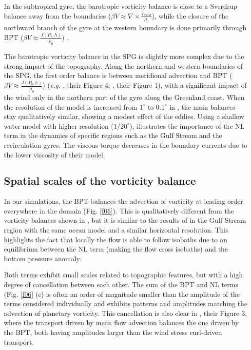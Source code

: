 \documentclass[os, manuscript]{copernicus}
\begin{document}
In the subtropical gyre, the barotropic vorticity balance is close to a Sverdrup balance away from the boundaries ($\beta V \approx \nabla \times \frac{\tau _{wind}}{\rho_{0}}$), while the closure of the northward branch of the gyre at the western boundary is done primarily through BPT ($\beta V \approx \frac{J(P_b,h)}{\rho _0}$)  \citep{schoonover2016}.

The barotropic vorticity balance in the SPG is slightly more complex due to the strong impact of the topography. Along the northern and western boundaries of the SPG, the first order balance is between meridional advection and BPT ($\beta V \approx \frac{J(P_b,h)}{\rho _0}$) (\textit{e.g.} \citet{hughes2001}, their Figure 4; \citet{yeager2015}, their Figure 1), with a significant impact of the wind only in the northern part of the gyre along the Greenland coast. When the resolution of the model is increased from $1^{\circ}$ to $0.1^{\circ}$ in \citet{yeager2015}, the main balances stay qualitatively similar, showing a modest effect of the eddies. Using a shallow water model with higher resolution ($1/20^{\circ}$), \cite{wang2017} illustrates the importance of the NL term in the dynamics of specific regions such as the Gulf Stream and the recirculation gyres. The viscous torque decreases in the boundary currents due to the lower viscosity of their model.

\subsection{Spatial scales of the vorticity balance}

In our simulations, the BPT balances the advection of vorticity at leading order everywhere in the domain  (Fig. \ref{f06}). This is qualitatively different from the vorticity balances shown in \citet{yeager2015}, but it is similar to the results of \citet{gula2015} in the Gulf Stream region with the same ocean model and a similar horizontal resolution. This highlights the fact that locally the flow is able to follow isobaths due to an equilibrium between the NL term (making the flow cross isobaths) and the bottom pressure anomaly.

Both terms exhibit small scales related to topographic features, but with a high degree of cancellation between each other. The sum of the BPT and NL terms (Fig. \ref{f06} (c) is often an order of magnitude smaller than the amplitude of the terms considered individually and exhibits patterns and amplitudes matching the advection of planetary vorticity. This cancellation is also clear in \cite{wang2017}, their Figure 3, where the transport driven by mean flow advection balances the one driven by the BPT, both having amplitudes larger than the wind stress curl-driven transport.
\end{document}
